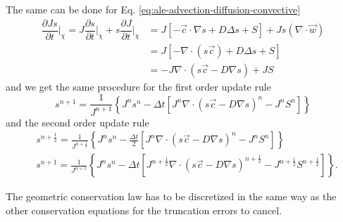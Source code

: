 \documentclass{article}
\newcommand{\pd}[2]{\dfrac{\partial #1}{\partial #2}}
\begin{document}
The same can be done for Eq. \eqref{eq:ale-advection-diffusion-convective}
\begin{equation}
    \begin{split}
        \pd{Js}{t}\bigg|_\chi =
        J \pd{s}{t}\bigg|_\chi + s \pd{J}{t}\bigg|_\chi &=
        J \left[-\vec{c} \cdot \nabla s + D \Delta s + S\right]
        + J s \left(\nabla \cdot \vec{w}\right) \\
        &= J \left[
            - \nabla \cdot \left(s \vec{c}\right)
            + D \Delta s
            + S
        \right] \\
        &= -J \nabla \cdot \left(s \vec{c} - D \nabla s\right) + JS
    \end{split}
\end{equation}
and we get the same procedure for the first order update rule
\begin{equation}
    s^{n+1} =
    \frac{1}{J^{n+1}} \left\{
        J^n s^n
        - \Delta t \left[
            J^n \nabla \cdot \left(s \vec{c} - D \nabla s\right)^n
            - J^n S^n
        \right]
    \right\}
\end{equation}
and the second order update rule
\begin{equation}
    \begin{split}
        &s^{n+\tfrac12} =
        \frac{1}{J^{n+\tfrac12}} \left\{
            J^n s^n
            - \frac{\Delta t}{2} \left[
                J^n \nabla \cdot \left(s \vec{c} - D \nabla s\right)^n
                - J^n S^n
            \right]
        \right\} \\
        &s^{n+1} =
        \frac{1}{J^{n+1}} \left\{
            J^n s^n
            - \Delta t \left[
                J^{n+\tfrac12} \nabla \cdot \left(s \vec{c} - D \nabla s\right)^{n+\tfrac12}
                - J^{n+\tfrac12} S^{n+\tfrac12}
            \right]
        \right\}.
    \end{split}
\end{equation}

The geometric conservation law has to be discretized in the same way as the other conservation equations for the truncation errors to cancel.


\end{document}
